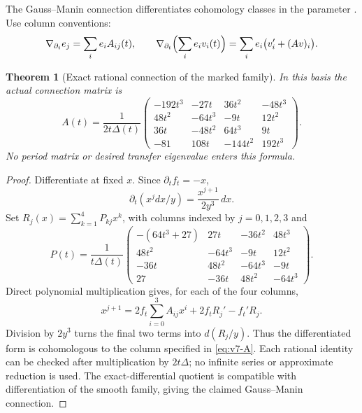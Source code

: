 \documentclass[11pt]{article}
\newtheorem{theorem}{Theorem}[section]
\theoremstyle{definition}
\theoremstyle{remark}
\begin{document}
The Gauss--Manin connection differentiates cohomology classes in the parameter
\cite{KatzOda}. Use column conventions:
\[
 \nabla_{\partial_t}e_j=\sum_i e_i A_{ij}(t),\qquad
 \nabla_{\partial_t}\Bigl(\sum_i e_i v_i(t)\Bigr)
     =\sum_i e_i\bigl(v_i'+(Av)_i\bigr).
\]

\begin{theorem}[Exact rational connection of the marked family]
\label{thm:v7-GM-matrix}
In this basis the actual connection matrix is
\begin{equation}
 \boxed{
 A(t)=\frac1{2t\Delta(t)}
 \begin{pmatrix}
 -192t^3&-27t&36t^2&-48t^3\\
 48t^2&-64t^3&-9t&12t^2\\
 36t&-48t^2&64t^3&9t\\
 -81&108t&-144t^2&192t^3
 \end{pmatrix}.}
 \label{eq:v7-A}
\end{equation}
No period matrix or desired transfer eigenvalue enters this formula.
\end{theorem}
\begin{proof}
Differentiate at fixed $x$. Since $\partial_t f_t=-x$,
\[
 \partial_t(x^j dx/y)=\frac{x^{j+1}}{2y^3}\,dx.
\]
Set $R_j(x)=\sum_{k=1}^4 P_{kj}x^k$, with columns indexed by $j=0,1,2,3$
and
\begin{equation}
 P(t)=\frac1{t\Delta(t)}
 \begin{pmatrix}
 -(64t^3+27)&27t&-36t^2&48t^3\\
 48t^2&-64t^3&-9t&12t^2\\
 -36t&48t^2&-64t^3&-9t\\
 27&-36t&48t^2&-64t^3
 \end{pmatrix}.
 \label{eq:v7-primitives}
\end{equation}
Direct polynomial multiplication gives, for each of the four columns,
\begin{equation}
 x^{j+1}
 =2f_t\sum_{i=0}^3A_{ij}x^i+2f_tR_j'-f_t'R_j.
 \label{eq:v7-reduction}
\end{equation}
Division by $2y^3$ turns the final two terms into $d(R_j/y)$.
Thus the differentiated form is cohomologous to the column specified in
\eqref{eq:v7-A}. Each rational identity can be checked after multiplication
by $2t\Delta$; no infinite series or approximate reduction is used.
The exact-differential quotient is compatible with differentiation of the
smooth family, giving the claimed Gauss--Manin connection.
\end{proof}
\end{document}
